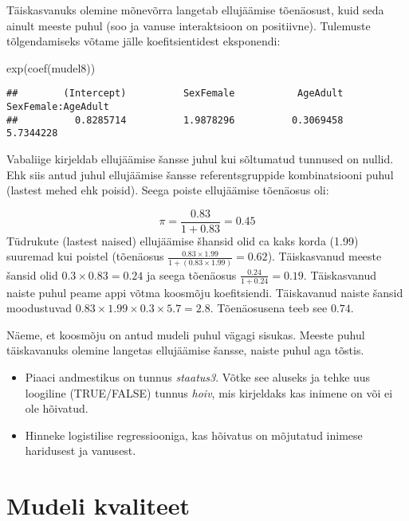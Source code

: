 \documentclass[
]{book}
\newenvironment{Shaded}{\begin{snugshade}}{\end{snugshade}}
\newcommand{\FunctionTok}[1]{\textcolor[rgb]{0.00,0.00,0.00}{#1}}
\newcommand{\NormalTok}[1]{#1}
\providecommand{\tightlist}{%
  \setlength{\itemsep}{0pt}\setlength{\parskip}{0pt}}
\begin{document}
Täiskasvanuks olemine mõnevõrra langetab ellujäämise tõenäosust, kuid seda ainult meeste puhul (soo ja vanuse interaktsioon on positiivne). Tulemuste tõlgendamiseks võtame jälle koefitsientidest eksponendi:

\begin{Shaded}
\begin{Highlighting}[]
\FunctionTok{exp}\NormalTok{(}\FunctionTok{coef}\NormalTok{(mudel8))}
\end{Highlighting}
\end{Shaded}

\begin{verbatim}
##        (Intercept)          SexFemale           AgeAdult SexFemale:AgeAdult 
##          0.8285714          1.9878296          0.3069458          5.7344228
\end{verbatim}

Vabaliige kirjeldab ellujäämise šansse juhul kui sõltumatud tunnused on nullid. Ehk siis antud juhul ellujäämise šansse referentsgruppide kombinatsiooni puhul (lastest mehed ehk poisid). Seega poiste ellujäämise tõenäosus oli:

\[\pi = \frac{0.83}{1+0.83} = 0.45\]
Tüdrukute (lastest naised) ellujäämise šhansid olid ca kaks korda (1.99) suuremad kui poistel (tõenäosus \(\frac{0.83\times1.99}{1+(0.83\times1.99)} = 0.62\)). Täiskasvanud meeste šansid olid \(0.3\times0.83 = 0.24\) ja seega tõenäosus \(\frac{0.24}{1+0.24} = 0.19\). Täiskasvanud naiste puhul peame appi võtma koosmõju koefitsiendi. Täiskavanud naiste šansid moodustuvad \(0.83\times1.99\times0.3\times5.7 = 2.8\). Tõenäosusena teeb see \(0.74\).

Näeme, et koosmõju on antud mudeli puhul vägagi sisukas. Meeste puhul täiskavanuks olemine langetas ellujäämise šansse, naiste puhul aga tõstis.

\begin{itemize}
\tightlist
\item
  Piaaci andmestikus on tunnus \emph{staatus3}. Võtke see aluseks ja tehke uus loogiline (TRUE/FALSE) tunnus \emph{hoiv}, mis kirjeldaks kas inimene on või ei ole hõivatud.\\
\item
  Hinneke logistilise regressiooniga, kas hõivatus on mõjutatud inimese haridusest ja vanusest.
\end{itemize}

\hypertarget{mudeli-kvaliteet}{%
\section{Mudeli kvaliteet}\label{mudeli-kvaliteet}}
\end{document}
